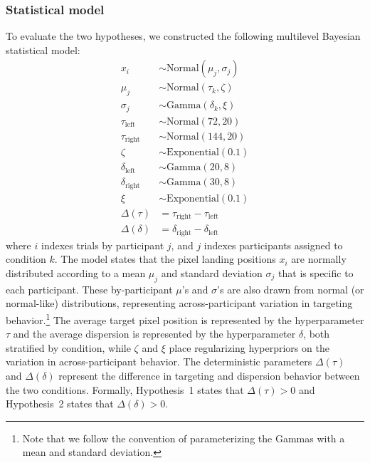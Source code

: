 \documentclass[doc,biblatex]{apa7}
\begin{document}
\subsubsection{Statistical model}

To evaluate the two hypotheses, we constructed the following multilevel Bayesian statistical model:
\begin{align*}
                  x_{i} & \sim \mathrm{Normal}(\mu_{j}, \sigma_{j}) \\
                \mu_{j} & \sim \mathrm{Normal}(\tau_k, \zeta) \\
             \sigma_{j} & \sim \mathrm{Gamma}(\delta_k, \xi) \\
     \tau_\mathrm{left} & \sim \mathrm{Normal}(72, 20) \\
    \tau_\mathrm{right} & \sim \mathrm{Normal}(144, 20) \\
                  \zeta & \sim \mathrm{Exponential}(0.1) \\
   \delta_\mathrm{left} & \sim \mathrm{Gamma}(20, 8) \\
  \delta_\mathrm{right} & \sim \mathrm{Gamma}(30, 8) \\
                    \xi & \sim \mathrm{Exponential}(0.1) \\
           \Delta(\tau) & = \tau_\mathrm{right} - \tau_\mathrm{left} \\
         \Delta(\delta) & = \delta_\mathrm{right} - \delta_\mathrm{left}
\end{align*}
where $i$ indexes trials by participant $j$, and $j$ indexes participants assigned to condition $k$. The model states that the pixel landing positions $x_i$ are normally distributed according to a mean $\mu_{j}$ and standard deviation $\sigma_{j}$ that is specific to each participant. These by-participant $\mu$'s and $\sigma$'s are also drawn from normal (or normal-like) distributions, representing across-participant variation in targeting behavior.\footnote{Note that we follow the convention of parameterizing the Gammas with a mean and standard deviation.} The average target pixel position is represented by the hyperparameter $\tau$ and the average dispersion is represented by the hyperparameter $\delta$, both stratified by condition, while $\zeta$ and $\xi$ place regularizing hyperpriors on the variation in across-participant behavior. The deterministic parameters $\Delta(\tau)$ and $\Delta(\delta)$ represent the difference in targeting and dispersion behavior between the two conditions. Formally, Hypothesis~1 states that $\Delta(\tau) > 0$ and Hypothesis~2 states that $\Delta(\delta) > 0$.
\end{document}
